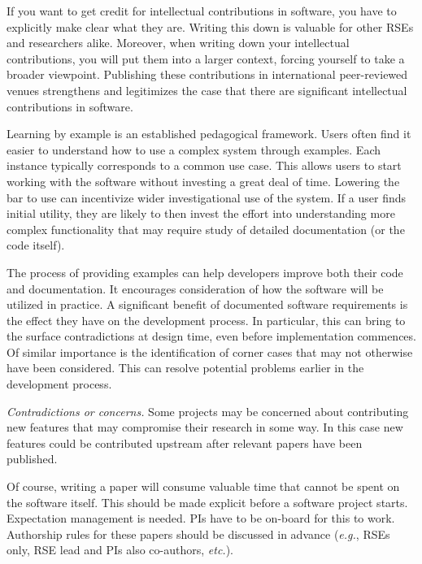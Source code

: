 \documentclass[a4paper,UKenglish]{dagman}
\newcommand{\eg}{\emph{e.g.},\xspace}
\newcommand{\etc}{\emph{etc.}\xspace}
\begin{document}
If you want to get credit for intellectual contributions in software, you have to explicitly make clear what they are. Writing this down is valuable for other RSEs and researchers alike. Moreover, when writing down your intellectual contributions, you will put them into a larger context, forcing yourself to take a broader viewpoint. Publishing these contributions in international peer-reviewed venues strengthens and legitimizes the case that there are significant intellectual contributions in software.


Learning by example is an established pedagogical framework. Users often find it easier to understand how to use a complex system through examples. Each instance typically corresponds to a common use case. This allows users to start working with the software without investing a great deal of time. Lowering the bar to use can incentivize wider investigational use of the system. If a user finds initial utility, they are likely to then invest the effort into understanding more complex functionality that may require study of detailed documentation (or the code itself).

The process of providing examples can help developers improve both their code and documentation. It encourages consideration of how the software will be utilized in practice. A significant benefit of documented software requirements is the effect they have on the development process. In particular, this can bring to the surface contradictions at design time, even before implementation commences. Of similar importance is the identification of corner cases that may not otherwise have been considered. This can resolve potential problems earlier in the development process.

\emph{Contradictions or concerns.}
Some projects may be concerned about contributing new features that may compromise their research in some way. In this case new features could be contributed upstream after relevant papers have been published.

Of course, writing a paper will consume valuable time that cannot be spent on the software itself. This should be made explicit before a software project starts. Expectation management is needed. PIs have to be on-board for this to work. Authorship rules for these papers should be discussed in advance (\eg RSEs only, RSE lead and PIs also co-authors, \etc).
\end{document}
